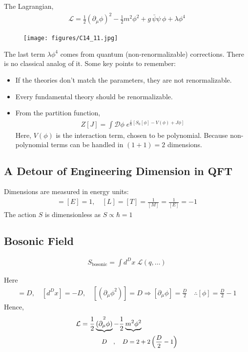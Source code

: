 \documentclass[14pt]{article} %
\begin{document}
The Lagrangian,
\begin{align*}
\mathcal{L} = \frac12 (\partial_\mu \phi)^2 - \frac12 m^2 \phi^2 + g \, \bar{\psi} \psi \, \phi + \lambda \phi^4
\end{align*}
\begin{figure}[H]
    \centering
    \texttt{[image: figures/C14\_11.jpg]}
    \caption*{}
    \label{fig:placeholder}
\end{figure}
\vspace{-1cm}
The last term $\lambda \phi^4$ comes from quantum (non-renormalizable) corrections. There is no classical analog of it. Some key points to remember:
\begin{itemize}
\item If the theories don't match the parameters, they are not renormalizable.
\item Every fundamental theory should be renormalizable.
\item From the partition function,
\begin{align*}
Z[J] = \int \mathcal{D}\phi \; e^{\frac{i}{\hbar} \left[ S_0[\phi] - V(\phi) + J\phi \right]}
\end{align*}
Here, $V(\phi)$ is the interaction term, chosen to be polynomial. Because non-polynomial terms can be handled in $(1+1) = 2$ dimensions.
\end{itemize}

\subsection{A Detour of Engineering Dimension in QFT}
Dimensions are measured in energy units:
\begin{align*}
[M] = [E] = 1, \quad [L] =[T] = \frac{1}{[M]} = \frac1{[E]} = -1
\end{align*}
The action $S$ is dimensionless as $S \propto \hbar = 1$

\subsection*{Bosonic Field}
\begin{align*}
S_{\text{bosonic}} = \int d^D x \; \mathcal{L}(q, \dots)
\end{align*}

Here
\begin{align*}
[\mathcal{L}]=D,\quad [d^D x] = -D, \quad [({\partial_\mu \phi}^2)] = D \Rightarrow [\partial_\mu \phi] =\frac D2 \quad\therefore [\phi] = \frac{D}{2} - 1
\end{align*}
Hence,
\begin{align}
\mathcal{L} = \frac12 &\underbrace{(\partial_\mu \phi)}^2 - \frac12 \underbrace{m^2 \phi^2} \\
& ~~~ \small{\text{\(D \quad,\quad D = 2 + 2\left( \frac{D}{2} - 1 \right)\)}}
\end{align}
\end{document}
